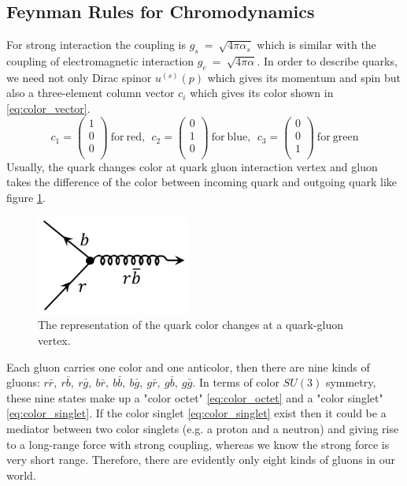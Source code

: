 \subsection{Feynman Rules for Chromodynamics}\label{subsec:Feynman_QCD}
For strong interaction the coupling is $g_{s}~=~\sqrt{4\pi\alpha_{s}}$ which is similar with the coupling of electromagnetic interaction $g_{e}~=~\sqrt{4\pi\alpha}$. In order to describe quarks, we need not only Dirac spinor $u^{(s)}(p)$ which gives its momentum and spin but also a three-element column vector $c_{i}$ which gives its color shown in \ref{eq:color_vector}.
\begin{equation}
c_{1}=\begin{pmatrix} 1 \\ 0 \\ 0 \\ \end{pmatrix}~\mathrm{for~red,~~}c_{2}=\begin{pmatrix} 0 \\ 1 \\ 0 \\ \end{pmatrix}~\mathrm{for~blue,~~}c_{3}=\begin{pmatrix} 0 \\ 0 \\ 1 \\ \end{pmatrix}~\mathrm{for~green}
\label{eq:color_vector}
\end{equation}
Usually, the quark changes color at quark gluon interaction vertex and gluon takes the difference of the color between incoming quark and outgoing quark like figure \ref{fig:color_change}.
\begin{figure}[h!]
 \begin{center}
\includegraphics[width=0.45\textwidth]{figures/theory/gluon_color.png}
\caption{The representation of the quark color changes at a quark-gluon vertex.}
  \label{fig:color_change}
 \end{center}
\end{figure}
Each gluon carries one color and one anticolor, then there are nine kinds of gluons: $r\bar{r},~r\bar{b},~r\bar{g},~b\bar{r},~b\bar{b},~b\bar{g},~g\bar{r},~g\bar{b},~g\bar{g}$. In terms of color $SU(3)$ symmetry, these nine states make up a "color octet" \ref{eq:color_octet} and a "color singlet" \ref{eq:color_singlet}. If the color singlet \ref{eq:color_singlet} exist then it could be a mediator between two color singlets (e.g. a proton and a neutron) and giving rise to a long-range force with strong coupling, whereas we know the strong force is very short range. Therefore, there are evidently only eight kinds of gluons in our world.

